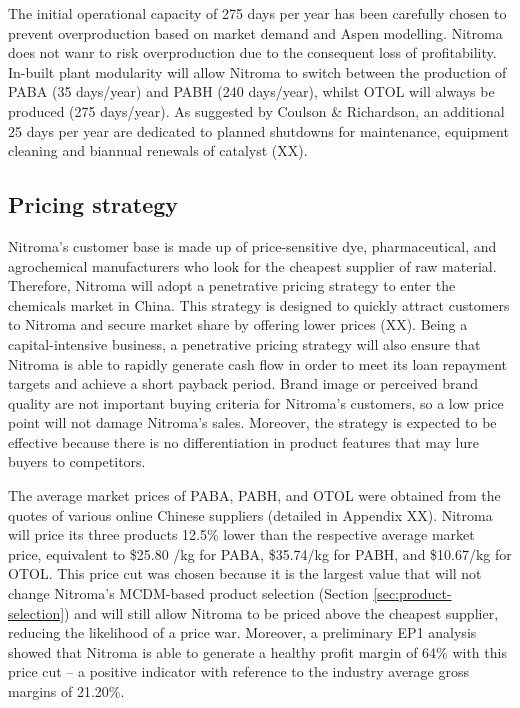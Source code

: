 The initial operational capacity of 275 days per year has been carefully chosen to prevent overproduction based on market demand and Aspen modelling. Nitroma does not wanr to risk overproduction due to the consequent loss of profitability. In-built plant modularity will allow Nitroma to switch between the production of PABA (35 days/year) and PABH (240 days/year), whilst OTOL will always be produced (275 days/year). As suggested by Coulson \& Richardson, an additional 25 days per year are dedicated to planned shutdowns for maintenance, equipment cleaning and biannual renewals of catalyst (XX). 

\subsection{Pricing strategy}
\label{sec:pricing-strategy}
Nitroma’s customer base is made up of price-sensitive dye, pharmaceutical, and agrochemical manufacturers who look for the cheapest supplier of raw material. Therefore, Nitroma will adopt a penetrative pricing strategy to enter the chemicals market in China. This strategy is designed to quickly attract customers to Nitroma and secure market share by offering lower prices (XX). Being a capital-intensive business, a penetrative pricing strategy will also ensure that Nitroma is able to rapidly generate cash flow in order to meet its loan repayment targets and achieve a short payback period. Brand image or perceived brand quality are not important buying criteria for Nitroma’s customers, so a low price point will not damage Nitroma’s sales. Moreover, the strategy is expected to be effective because there is no differentiation in product features that may lure buyers to competitors.

The average market prices of PABA, PABH, and OTOL were obtained from the quotes of various online Chinese suppliers (detailed in Appendix XX).  Nitroma will price its three products 12.5\% lower than the respective average market price, equivalent to \$25.80 /kg for PABA, \$35.74/kg for PABH, and \$10.67/kg for OTOL. This price cut was chosen because it is the largest value that will not change Nitroma’s MCDM-based product selection (Section \ref{sec:product-selection}) and will still allow Nitroma to be priced above the cheapest supplier, reducing the likelihood of a price war. Moreover, a preliminary EP1 analysis showed that Nitroma is able to generate a healthy profit margin of 64\% with this price cut – a positive indicator with reference to the industry average gross margins of 21.20\%. 

